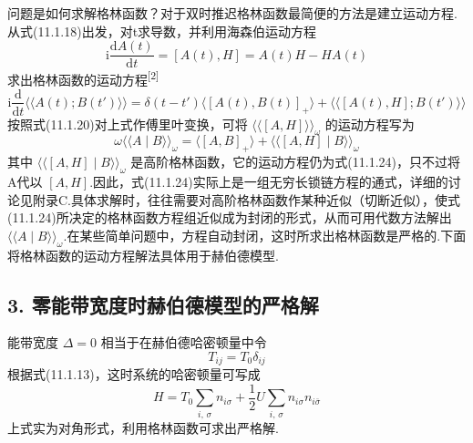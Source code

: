 问题是如何求解格林函数？对于双时推迟格林函数最简便的方法是建立运动方程.从式(11.1.18)出发，对t求导数，并利用海森伯运动方程
\begin{equation}
  \mathrm{i}\frac{\mathrm{d}A(t)}{\mathrm{d}t}=[A(t),H]
  =A(t)H-HA(t)
\end{equation}
求出格林函数的运动方程\textsuperscript{[2]}
\begin{equation}
  \mathrm{i}\frac{\mathrm{d}}{\mathrm{d}t}
  \langle\langle A(t);B(t')\rangle\rangle
  =\delta(t-t')\langle[A(t),B(t)]_{+}\rangle
  +\langle\langle[A(t),H];B(t')\rangle\rangle
\end{equation}
按照式(11.1.20)对上式作傅里叶变换，可将 $\langle\langle[A,H]\rangle\rangle_{\omega}$ 的运动方程写为
\begin{equation}
  \omega\langle\langle A\mid B\rangle\rangle_{\omega}
  =\langle[A,B]_{+}\rangle
  +\langle\langle[A,H]\mid B\rangle\rangle_{\omega}
\end{equation}
其中 $\langle\langle[A,H]\mid B\rangle\rangle_{\omega}$ 是高阶格林函数，它的运动方程仍为式(11.1.24)，只不过将A代以 $[A,H]$.因此，式(11.1.24)实际上是一组无穷长锁链方程的通式，详细的讨论见附录C.具体求解时，往往需要对高阶格林函数作某种近似（切断近似），使式(11.1.24)所决定的格林函数方程组近似成为封闭的形式，从而可用代数方法解出 $\langle\langle A\mid B\rangle\rangle_{\omega}$.在某些简单问题中，方程自动封闭，这时所求出格林函数是严格的.下面将格林函数的运动方程解法具体用于赫伯德模型.

\subsection*{3. 零能带宽度时赫伯德模型的严格解}

能带宽度 $\Delta=0$ 相当于在赫伯德哈密顿量中令
\begin{equation}
  T_{ij}=T_{0}\delta_{ij}
\end{equation}
根据式(11.1.13)，这时系统的哈密顿量可写成
\begin{equation}
  H=T_{0}\sum_{i,\,\sigma}n_{i\sigma}
  +\frac{1}{2}U\sum_{i,\,\sigma}n_{i\sigma}n_{i\bar{\sigma}}
\end{equation}
上式实为对角形式，利用格林函数可求出严格解.

